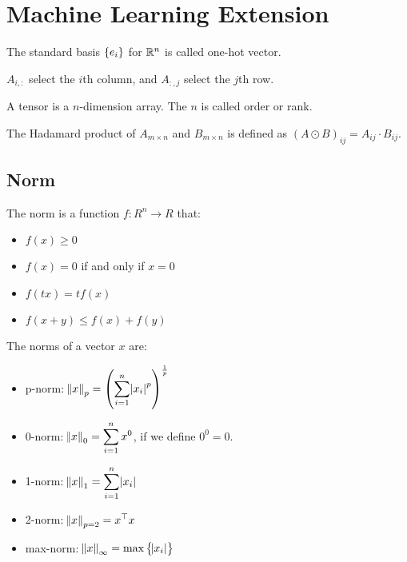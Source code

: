 \chapter{Machine Learning Extension}


The standard basis $\set{e_i}$ for $\mathbb{R}^n$ is called one-hot vector.

$A_{i,:}$ select the $i$th column, and $A_{:,j}$ select the $j$th row.

A tensor is a $n$-dimension array. The $n$ is called order or rank.


\begin{definition}
    The Hadamard product of $A_{m \times n}$ and $B_{m\times n}$ is defined as $(A \odot B)_{ij} = A_{ij} \cdot B_{ij}$.
\end{definition}

\section{Norm}

\begin{definition}[Norm]
    The norm is a function $f : R^n \rightarrow R$ that:
    \begin{itemize}
        \item $f(x) \geq 0$
        \item $f(x) = 0$ if and only if $x = 0$
        \item $f(tx) = t f(x)$
        \item $f(x+y) \leq f(x) + f(y)$
    \end{itemize}
\end{definition}

\begin{definition}
    The norms of a vector $x$ are:
\begin{itemize}
    \item p-norm: $\displaystyle \norm{x}_p = \left(\sum_{i=1}^n \abs{x_i}^p \right)^{\frac{1}{p}}$
    \item 0-norm: $\displaystyle \norm{x}_0 = \sum_{i=1}^n x^0$, if we define $0^0 = 0$.
    \item 1-norm: $\displaystyle \norm{x}_1 = \sum_{i=1}^n \abs{x_i}$
    \item 2-norm: $\displaystyle \norm{x}_{p=2} = {x}^\top x$
    \item max-norm: $\norm{x}_\infty = \max \set{\abs{x_i}}$
\end{itemize}
\end{definition}

